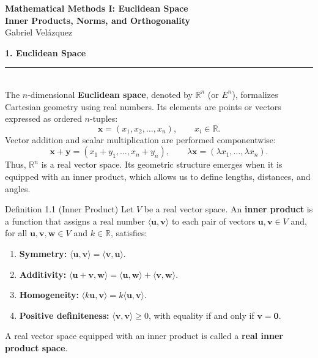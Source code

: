 \documentclass[11pt,letterpaper]{article}
\newcommand{\manualsection}[1]{%
  \Needspace{16\baselineskip}%
  \vspace{0.35cm}
  {\Large\bfseries\color{blackmain} #1}\\[2pt]
  {\color{orangeacc}\rule{\linewidth}{1.4pt}}\\[0.25cm]
}
\newcommand{\term}[1]{\textbf{\color{orangeacc}#1}}
\newcommand{\termb}[1]{\textbf{\color{blackmain}#1}}
\begin{document}
\color{blackmain}

\begin{center}
  {\LARGE\textbf{\color{blackmain}Mathematical Methods I: Euclidean Space}}\\[0.2cm]
  {\Large\textcolor{orangeacc}{\textbf{Inner Products, Norms, and Orthogonality}}}\\[0.4cm]
  {\large\textcolor{graymuted}{Gabriel Velázquez}}\\[0.6cm]
\end{center}

\manualsection{1. Euclidean Space}

The $n$-dimensional \term{Euclidean space}, denoted by $\mathbb{R}^n$ (or $E^n$),
formalizes Cartesian geometry using real numbers. Its elements are points or vectors
expressed as ordered $n$-tuples:
\begin{equation}
  \mathbf{x}=(x_1,x_2,\ldots,x_n),\qquad x_i\in\mathbb{R}.
\end{equation}
Vector addition and scalar multiplication are performed componentwise:
\begin{equation}
  \mathbf{x}+\mathbf{y}=(x_1+y_1,\ldots,x_n+y_n),
  \qquad
  \lambda\mathbf{x}=(\lambda x_1,\ldots,\lambda x_n).
\end{equation}
Thus, $\mathbb{R}^n$ is a real vector space. Its geometric structure emerges when it is
equipped with an inner product, which allows us to define lengths, distances, and angles.

\begin{infobox}[orangeacc]{Definition 1.1 (Inner Product)}
Let $V$ be a real vector space. An \term{inner product} is a function that assigns a
real number $\langle \mathbf{u},\mathbf{v}\rangle$ to each pair of vectors
$\mathbf{u},\mathbf{v}\in V$ and, for all
$\mathbf{u},\mathbf{v},\mathbf{w}\in V$ and $k\in\mathbb{R}$, satisfies:
\begin{enumerate}
  \item \textbf{Symmetry:}
  $\langle\mathbf{u},\mathbf{v}\rangle=\langle\mathbf{v},\mathbf{u}\rangle$.
  \item \textbf{Additivity:}
  $\langle\mathbf{u}+\mathbf{v},\mathbf{w}\rangle
  =\langle\mathbf{u},\mathbf{w}\rangle+\langle\mathbf{v},\mathbf{w}\rangle$.
  \item \textbf{Homogeneity:}
  $\langle k\mathbf{u},\mathbf{v}\rangle=k\langle\mathbf{u},\mathbf{v}\rangle$.
  \item \textbf{Positive definiteness:}
  $\langle\mathbf{v},\mathbf{v}\rangle\geq0$, with equality if and only if
  $\mathbf{v}=\mathbf{0}$.
\end{enumerate}
A real vector space equipped with an inner product is called a
\termb{real inner product space}.
\end{infobox}
\end{document}
